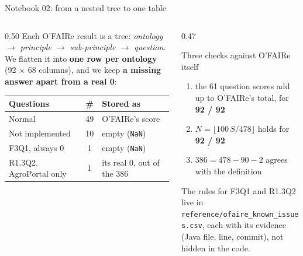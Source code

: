 \documentclass[aspectratio=169,10pt]{beamer}
\newcommand{\evidence}[1]{{\scriptsize\color{dtgrey}#1}}
\newcommand{\code}[1]{{\color{dtblue}\texttt{#1}}}
\begin{document}
\begin{frame}{Notebook 02: from a nested tree to one table}
  \begin{columns}[T]
    \begin{column}{0.50\textwidth}
      \small
      Each O'FAIRe result is a tree: \emph{ontology $\rightarrow$ principle $\rightarrow$
      sub-principle $\rightarrow$ question}. We flatten it into \textbf{one row per ontology}
      (92 $\times$ 68 columns), and we keep \textbf{a missing answer apart from a real 0}:\\[6pt]
      \scriptsize
      \begin{tabular}{@{}l c l@{}}
        \toprule
        Questions & \# & Stored as\\
        \midrule
        Normal & 49 & O'FAIRe's score\\
        Not implemented & 10 & empty (\code{NaN})\\
        F3Q1, always 0 & 1 & empty (\code{NaN})\\
        R1.3Q2, AgroPortal only & 1 & its real 0, out of the 386\\
        \bottomrule
      \end{tabular}
    \end{column}
    \begin{column}{0.47\textwidth}
      \begin{exampleblock}{Three checks against O'FAIRe itself}
        \small
        \begin{enumerate}
          \item the 61 question scores add up to O'FAIRe's total, for \textbf{92 / 92}
          \item $N = \lfloor 100\,S / 478 \rfloor$ holds for \textbf{92 / 92}
          \item $386 = 478 - 90 - 2$ agrees with the definition
        \end{enumerate}
      \end{exampleblock}
      \evidence{The rules for F3Q1 and R1.3Q2 live in \code{reference/ofaire\_known\_issues.csv},
      each with its evidence (Java file, line, commit), not hidden in the code.}
    \end{column}
  \end{columns}
\end{frame}
\end{document}
